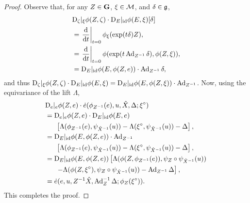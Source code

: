 \documentclass{article}
\newcommand\at[2]{\left.#1\right|_{#2}}
\begin{document}
\begin{proof}
Observe that, for any $Z \in \mathbf{G}$, $\xi \in \mathcal{M}$, and $\delta \in \mathfrak{g}$,
\begin{align*}
    &\tD_\zeta |_\xi \phi(Z, \zeta) \cdot \tD_E |_\id \phi(E, \xi) [\delta] \\
    &= \at{\ddt}{t=0} \phi_\xi (\exp(t \delta)Z), \\
    &= \at{\ddt}{t=0} \phi(\exp(t \Ad_{Z^{-1}}\delta), \phi(Z, \xi)), \\
    &= \tD_E |_\id \phi(E, \phi(Z, e)) \cdot \Ad_{Z^{-1}} \delta,
\end{align*}
and thus $\mathrm{D}_\zeta |_\xi \phi(Z, \zeta) \cdot \mathrm{D}_E |_{\mathrm{id}} \phi(E, \xi) = \mathrm{D}_E |_{\mathrm{id}} \phi(E, \phi(Z, \xi)) \cdot \operatorname{Ad}_{Z^{-1}}$.
Now, using the equivariance of the lift $\Lambda$,
\begin{align*}
    &\mathrm{D}_e |_e \phi(Z, e) \cdot \dot{e}(\phi_{Z^{-1}}(e), u, \hat{X}, \Delta; {\xi}^\circ) \\
    &= \mathrm{D}_e |_e \phi(Z, e) \cdot \mathrm{D}_E |_{\mathrm{id}} \phi(E,e)
    \\ &\phantom{==}
    \left[\Lambda(\phi_{Z^{-1}}(e), \psi_{\hat{X}^{-1}}(u)) - \Lambda({\xi}^\circ, \psi_{\hat{X}^{-1}}(u)) - \Delta\right], \\
    &= \mathrm{D}_E |_{\mathrm{id}} \phi(E, \phi(Z, e)) \cdot \operatorname{Ad}_{Z^{-1}}
    \\ &\phantom{==}
    \left[\Lambda(\phi_{Z^{-1}}(e), \psi_{\hat{X}^{-1}}(u)) - \Lambda({\xi}^\circ, \psi_{\hat{X}^{-1}}(u)) - \Delta\right], \\
    &= \mathrm{D}_E |_{\mathrm{id}} \phi(E, \phi(Z, e))
    \left[\Lambda(\phi(Z,\phi_{Z^{-1}}(e)), \psi_{Z} \circ \psi_{\hat{X}^{-1}}(u)) \right.
    \\ &\phantom{==}
     \left. - \Lambda(\phi(Z,{\xi}^\circ), \psi_{Z} \circ \psi_{\hat{X}^{-1}}(u)) - \operatorname{Ad}_{Z^{-1}}\Delta\right], \\
    &= \dot{e} (e, u, Z^{-1}\hat{X}, \operatorname{Ad}_Z^{-1} \Delta; \phi_Z({\xi}^\circ)).
\end{align*}
This completes the proof.
\end{proof}
\end{document}
